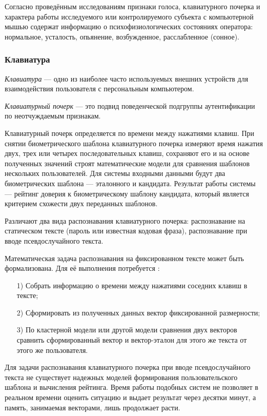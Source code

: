 Согласно проведённым исследованиям \cite{recognitionOfPsycho} признаки голоса, клавиатурного почерка и характера работы исследуемого или контролируемого субъекта с компьютерной мышью содержат информацию о психофизиологических состояниях оператора: нормальное, усталость, опьянение, возбужденное, расслабленное (сонное).

\subsubsection{Клавиатура}
\textit{Клавиатура} --- одно из наиболее часто используемых внешних устройств для взаимодействия пользователя с персональным компьютером.

\textit{Клавиатурный почерк} --- это подвид поведенческой подгруппы аутентификации по неотчуждаемым признакам. \cite{keystroke}

Клавиатурный почерк определяется по времени между нажатиями клавиш. При снятии биометрического шаблона клавиатурного почерка измеряют время нажатия двух, трех или четырех последовательных клавиш, сохраняют его и на основе полученных значений строят математические модели для сравнения шаблонов нескольких пользователей. \cite{intrusionDetection} Для системы входными данными будут два биометрических шаблона --- эталонного и кандидата. Результат работы системы --- рейтинг доверия к биометрическому шаблону кандидата, который является критерием схожести двух переданных шаблонов.

Различают два вида распознавания клавиатурного почерка: распознавание на статическом тексте (пароль или известная кодовая фраза), распознавание при вводе псевдослучайного текста. \cite{keystroke}

Математическая задача распознавания на фиксированном тексте может быть формализована. Для её выполнения потребуется \cite{keystroke}:
\begin{itemize}
\item[1)] Собрать информацию о времени между нажатиями соседних клавиш в тексте;
\item[2)] Сформировать из полученных данных вектор фиксированной размерности;
\item[3)] По кластерной модели или другой модели сравнения двух векторов сравнить сформированный вектор и вектор-эталон для этого же текста от этого же пользователя.
\end{itemize}

Для задачи распознавания клавиатурного почерка при вводе псевдослучайного текста не существует надежных моделей формирования пользовательского шаблона и вычисления рейтинга. Время работы подобных систем не позволяет в реальном времени оценить ситуацию и выдает результат через десятки минут, а память, занимаемая векторами, лишь продолжает расти. \cite{keystroke}

